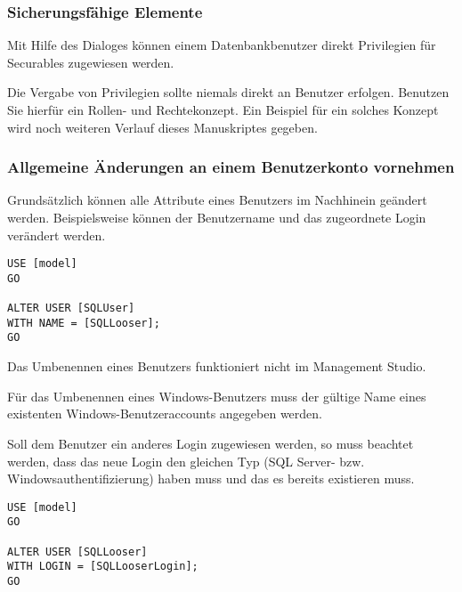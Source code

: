           \subsubsection{Sicherungsfähige Elemente}
            Mit Hilfe des Dialoges  können
            einem Datenbankbenutzer direkt Privilegien für Securables zugewiesen
            werden.
            \begin{merke}
              Die Vergabe von Privilegien sollte niemals direkt an Benutzer
              erfolgen. Benutzen Sie hierfür ein Rollen- und Rechtekonzept. Ein
              Beispiel für ein solches Konzept wird noch weiteren Verlauf dieses
              Manuskriptes gegeben.
            \end{merke}
            \begin{literaturinternet}
              \item \cite{aa337545}
            \end{literaturinternet}
          \subsubsection{Allgemeine Änderungen an einem Benutzerkonto vornehmen}
            Grundsätzlich können alle Attribute eines Benutzers im Nachhinein
            geändert werden. Beispielsweise können der
            Benutzername und das zugeordnete Login verändert werden.
            \begin{lstlisting}[language=ms_sql, caption={Umbenennen eines
            Benutzers}, label=admin19_14]
USE [model]
GO

ALTER USER [SQLUser]
WITH NAME = [SQLLooser];
GO
            \end{lstlisting}
            \begin{merke}
              Das Umbenennen eines Benutzers funktioniert nicht im Management
              Studio.
              
              Für das Umbenennen eines Windows-Benutzers muss der gültige Name
              eines existenten Windows-Benutzeraccounts angegeben werden.
            \end{merke}            
            Soll dem Benutzer ein anderes Login zugewiesen werden, so muss
            beachtet werden, dass das neue Login den gleichen Typ (SQL Server-
            bzw. Windowsauthentifizierung) haben muss und das es bereits
            existieren muss.
            \begin{lstlisting}[language=ms_sql, caption={Umbenennen eines
            Benutzers}, label=admin19_15]
USE [model]
GO

ALTER USER [SQLLooser]
WITH LOGIN = [SQLLooserLogin];
GO
            \end{lstlisting}
            \begin{literaturinternet}
              \item \cite{ms176060}
            \end{literaturinternet}
